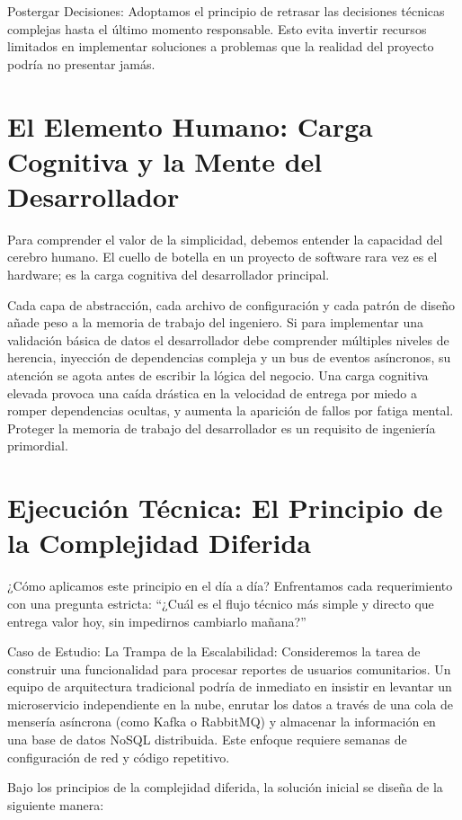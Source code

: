 \documentclass[14pt,a4paper,oneside]{extbook}
\begin{document}
Postergar Decisiones: Adoptamos el principio de retrasar las decisiones técnicas complejas hasta el último momento responsable. Esto evita invertir recursos limitados en implementar soluciones a problemas que la realidad del proyecto podría no presentar jamás.

\section{El Elemento Humano: Carga Cognitiva y la Mente del Desarrollador}

Para comprender el valor de la simplicidad, debemos entender la capacidad del cerebro humano. El cuello de botella en un proyecto de software rara vez es el hardware; es la carga cognitiva del desarrollador principal.

Cada capa de abstracción, cada archivo de configuración y cada patrón de diseño añade peso a la memoria de trabajo del ingeniero. Si para implementar una validación básica de datos el desarrollador debe comprender múltiples niveles de herencia, inyección de dependencias compleja y un bus de eventos asíncronos, su atención se agota antes de escribir la lógica del negocio. Una carga cognitiva elevada provoca una caída drástica en la velocidad de entrega por miedo a romper dependencias ocultas, y aumenta la aparición de fallos por fatiga mental. Proteger la memoria de trabajo del desarrollador es un requisito de ingeniería primordial.

\section{Ejecución Técnica: El Principio de la Complejidad Diferida}

¿Cómo aplicamos este principio en el día a día? Enfrentamos cada requerimiento con una pregunta estricta: \enquote{¿Cuál es el flujo técnico más simple y directo que entrega valor hoy, sin impedirnos cambiarlo mañana?}

Caso de Estudio: La Trampa de la Escalabilidad: Consideremos la tarea de construir una funcionalidad para procesar reportes de usuarios comunitarios. Un equipo de arquitectura tradicional podría de inmediato en insistir en levantar un microservicio independiente en la nube, enrutar los datos a través de una cola de mensería asíncrona (como Kafka o RabbitMQ) y almacenar la información en una base de datos NoSQL distribuida. Este enfoque requiere semanas de configuración de red y código repetitivo.

Bajo los principios de la complejidad diferida, la solución inicial se diseña de la siguiente manera:
\end{document}
